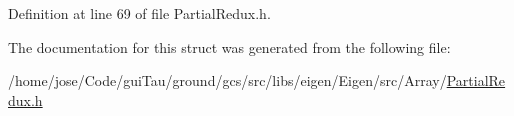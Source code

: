 Definition at line 69 of file Partial\-Redux.\-h.



The documentation for this struct was generated from the following file\-:\begin{DoxyCompactItemize}
\item 
/home/jose/\-Code/gui\-Tau/ground/gcs/src/libs/eigen/\-Eigen/src/\-Array/\hyperlink{_partial_redux_8h}{Partial\-Redux.\-h}\end{DoxyCompactItemize}

